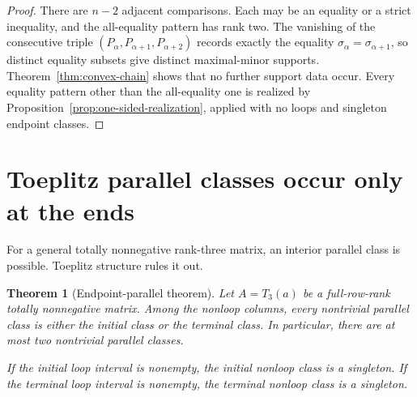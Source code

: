 \documentclass{amsart}
\numberwithin{equation}{section}
\newtheorem{theorem}{Theorem}
\theoremstyle{definition}
\theoremstyle{remark}
\begin{document}
\begin{proof}
There are $n-2$ adjacent comparisons.  Each may be an equality or a strict inequality, and the all-equality pattern has rank two.  The vanishing of the consecutive triple $(P_\alpha,P_{\alpha+1},P_{\alpha+2})$ records exactly the equality $\sigma_\alpha=\sigma_{\alpha+1}$, so distinct equality subsets give distinct maximal-minor supports.  Theorem~\ref{thm:convex-chain} shows that no further support data occur.  Every equality pattern other than the all-equality one is realized by Proposition~\ref{prop:one-sided-realization}, applied with no loops and singleton endpoint classes.
\end{proof}

\section{Toeplitz parallel classes occur only at the ends}

For a general totally nonnegative rank-three matrix, an interior parallel class is possible.  Toeplitz structure rules it out.

\begin{theorem}[Endpoint-parallel theorem]\label{thm:endpoint-parallel}
Let $A=T_3(a)$ be a full-row-rank totally nonnegative matrix.  Among the nonloop columns, every nontrivial parallel class is either the initial class or the terminal class.  In particular, there are at most two nontrivial parallel classes.

If the initial loop interval is nonempty, the initial nonloop class is a singleton.  If the terminal loop interval is nonempty, the terminal nonloop class is a singleton.
\end{theorem}
\end{document}
